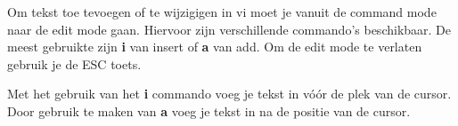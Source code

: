 Om tekst toe tevoegen of te wijzigigen in vi moet je vanuit de command mode naar de edit mode gaan. Hiervoor zijn verschillende commando's beschikbaar. De meest gebruikte zijn \textbf{i} van insert of \textbf{a} van add. Om de edit mode te verlaten gebruik je de \textsc{ESC} toets.

Met het gebruik van het \textbf{i} commando voeg je tekst in v\'o\'or de plek van de cursor. Door gebruik te maken van \textbf{a} voeg je tekst in na de positie van de cursor.
